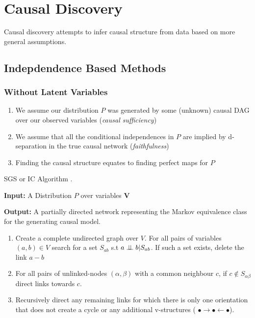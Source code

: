 \documentclass[20pt]{extreport}
\begin{document}
\section*{Causal Discovery}

Causal discovery attempts to infer causal structure from data based on more general assumptions. 

\subsection*{Indepdendence Based Methods}
\subsubsection*{Without Latent Variables}
\begin{enumerate}
\item We assume our distribution $P$ was generated by some (unknown) causal DAG over our observed variables (\emph{causal sufficiency}) 
\item We assume that all the conditional independences in $P$ are implied by d-separation in the true causal network (\emph{faithfulness}) 
\item Finding the causal structure equates to finding perfect maps for $P$
\end{enumerate}

\begin{algorithm}
\caption{SGS or IC Algorithm \cite{Sprites,Pearl2000}. \label{alg:spect}}
\textbf{Input:} A Distribution $P$ over variables $\boldsymbol{V}$

\textbf{Output:} A partially directed network representing the Markov equivalence class for the generating causal model.
\begin{enumerate}
\item Create a complete undirected graph over $V$. For all pairs of variables $(a,b) \in V$ search for a set $S_{ab}$ s.t $a \perp\!\!\!\perp b|S_{ab}$. If such a set exists, delete the link $a-b$
\item For all pairs of unlinked-nodes $(\alpha, \beta)$ with a common neighbour $c$, if $c \notin S_{\alpha \beta}$ direct links towards $c$.
\item Recursively direct any remaining links for which there is only one orientation that does not create a cycle or any additional v-structures ( $\bullet \rightarrow \bullet \leftarrow \bullet$). 
\end{enumerate}
\end{algorithm}
\end{document}
